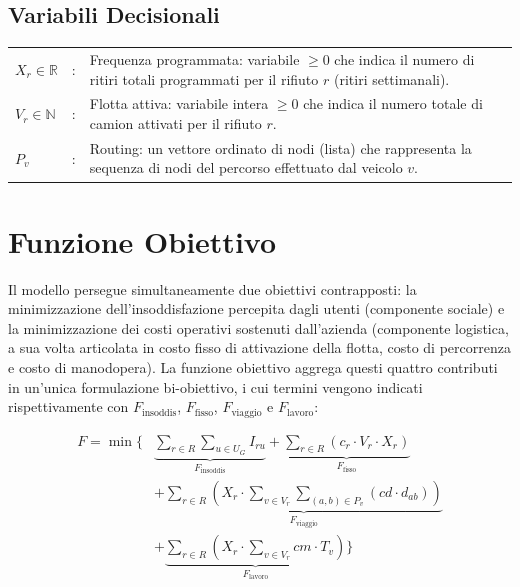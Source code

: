\subsection{Variabili Decisionali}

\begin{longtable}[l]{@{}ll>{\raggedright\arraybackslash}p{10.5cm}}
	$X_r \in \mathbb{R}$ & : & Frequenza programmata: variabile $\ge 0$ che indica il numero di ritiri totali programmati per il rifiuto $r$ (ritiri settimanali). \\
	$V_r \in \mathbb{N}$ & : & Flotta attiva: variabile intera $\ge 0$ che indica il numero totale di camion attivati per il rifiuto $r$. \\
	$P_v$ & : & Routing: un vettore ordinato di nodi (lista) che rappresenta la sequenza di nodi del percorso effettuato dal veicolo $v$. \\
\end{longtable}


\section{Funzione Obiettivo}

Il modello persegue simultaneamente due obiettivi contrapposti: la minimizzazione dell'insoddisfazione percepita dagli utenti (componente sociale) e la minimizzazione dei costi operativi sostenuti dall'azienda (componente logistica, a sua volta articolata in costo fisso di attivazione della flotta, costo di percorrenza e costo di manodopera). La funzione obiettivo aggrega questi quattro contributi in un'unica formulazione bi-obiettivo, i cui termini vengono indicati rispettivamente con $F_{\text{insoddis}}$, $F_{\text{fisso}}$, $F_{\text{viaggio}}$ e $F_{\text{lavoro}}$:

\begin{equation}
	\begin{split}
		F = \min \Biggl\{ & \underbrace{\sum_{r \in R} \sum_{u \in U_G} I_{ru}}_{F_{\text{insoddis}}} + \underbrace{\sum_{r \in R} (c_r \cdot V_{r} \cdot X_{r})}_{F_{\text{fisso}}} \\
		& + \underbrace{\sum_{r \in R} \left( X_{r} \cdot \sum_{v \in V_{r}} \sum_{(a,b) \in P_{v}} (cd \cdot d_{ab}) \right)}_{F_{\text{viaggio}}} \\
		& + \underbrace{\sum_{r \in R} \left( X_{r} \cdot \sum_{v \in V_{r}} cm \cdot T_{v} \right)}_{F_{\text{lavoro}}} \Biggr\}
	\end{split}
	\label{eq:obiettivo-completo}
\end{equation}

